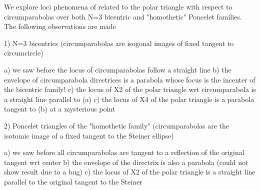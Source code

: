 We explore loci phenomena of related to the polar triangle with respect to circumparabolas over both N=3 bicentric and "homothetic" Poncelet families. The following observations are made

1) N=3 bicentrics (circumparabolas are isogonal images of fixed tangent to circumcircle)

a) we saw before the locus of circumparabolas follow a straight line
b) the envelope of circumparabola directrices is a parabola whose focus is the incenter of the bicentric family!
c) the locus of X2 of the polar triangle wrt circumparabola is a straight line parallel to (a)
c) the locus of X4 of the polar triangle is a parabola tangent to (b) at a mysterious point

2) Poncelet triangles of the "homothetic family" (circumparabolas are the isotomic image of a fixed tangent to the Steiner ellipse)

a) we saw before all circumparabolas are tangent to a reflection of the original tangent wrt center
b) the envelope of the directrix is also a parabola (could not show result due to a bug)
c) the locus of X2 of the polar triangle is a straight line parallel to the original tangent to the Steiner
